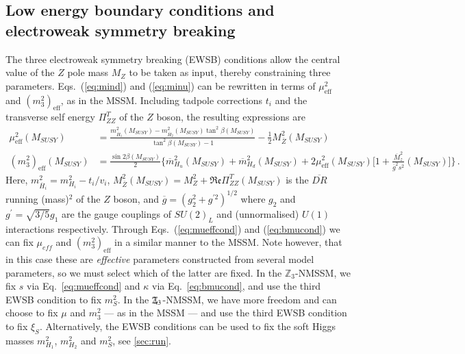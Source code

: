 \documentclass[final,3p,times,pdflatex]{elsarticle}
\newcommand{\Zv}{\,\mathbf{\backslash}\mkern-11.0mu{\mathbb{Z}}_{3}} %
\begin{document}
\subsection{Low energy boundary conditions and electroweak 
symmetry breaking \label{ewsb}} 
The three electroweak symmetry breaking (EWSB) conditions allow the central 
value of the $Z$ pole mass $M_Z$ to be taken as input, thereby constraining 
three parameters. Eqs.~(\ref{eq:mind}) and (\ref{eq:minu}) can be rewritten in
terms 
 of $\mu_\textrm{eff}^2$ and $(m_3^2)_\textrm{eff}$, as in the MSSM. Including 
tadpole corrections $t_i$ and the transverse self energy $\Pi^T_{ZZ}$ of the $Z$ 
boson, the resulting expressions are 
%
\begin{align}
  \mu_\textrm{eff}^2(M_{SUSY}) &=
  \frac{m_{\overline{H}_1}^2(M_{SUSY}) -
    m_{\overline{H}_2}^2(M_{SUSY}) \tan^2 \beta(M_{SUSY})}{\tan^2
    \beta(M_{SUSY}) - 1} - \frac{1}{2} M_{\overline Z}^2
  (M_{SUSY})\label{eq:mueffcond}\\ 
%
  (m^2_3)_\textrm{eff}(M_{SUSY})&=\frac{\sin{2\beta}(M_{SUSY})}{2}\Bigg\{\overline{m}_{H_u}^2(M_{SUSY})+\overline{m}_{H_d}^2(M_{SUSY})+
  2\mu_\textrm{eff}^2(M_{SUSY})\Bigg[1+\frac{\overline{M}_z^2}{\overline{g}^2s^2}(M_{SUSY})\Bigg]\Bigg\}\,.\label{eq:bmucond}
\end{align} 
% 
Here, $m_{\overline{H}_i}^2 = m_{H_i}^2 - t_i/v_i$, 
$M_{\overline Z}^2(M_{SUSY}) = M_Z^2 + \Re\mathfrak{e}\Pi_{ZZ}^T(M_{SUSY})$ is the 
$\overline{DR}$ running (mass)$^2$ of the $Z$ boson, and 
$\overline{g} = (g_2^2+g^{\prime 2})^{1/2}$ where $g_2$ and $g^{\prime}=\sqrt{3/5}g_1$
are the gauge couplings of $SU(2)_L$ and (unnormalised) $U(1)$ interactions 
respectively.  Through Eqs.~(\ref{eq:mueffcond}) and (\ref{eq:bmucond}) we
can fix $\mu_{eff}$ and $(m^2_3)_\textrm{eff}$ in a similar manner
to the MSSM.  Note however, that in this case these are {\it effective} 
parameters constructed from several model parameters, so we must select which
of the latter are fixed.
In the $\mathbb{Z}_3$-NMSSM, we fix $s$ via Eq.~\ref{eq:mueffcond} and $\kappa$
via Eq.~\ref{eq:bmucond}, and use the third EWSB condition to fix
$m_S^2$.  In the $\Zv$-NMSSM, we have more freedom and can choose to fix
$\mu$ and $m_3^2$ --- as in the MSSM --- and use the third EWSB
condition to fix $\xi_S$.
Alternatively, the EWSB conditions can be used to fix the soft Higgs
masses $m_{H_1}^2$, $m_{H_2}^2$ and $m_S^2$, see
\ref{sec:run}.
\end{document}
